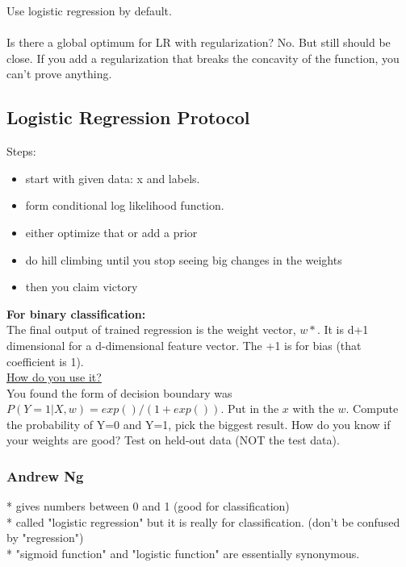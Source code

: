 Use logistic regression by default.  \hfill \\  \hfill \\

Is there a global optimum for LR with regularization?
No.  But still should be close. 
If you add a regularization that breaks the concavity of the function, you can't prove anything.
\hfill \\

\subsection{Logistic Regression Protocol}
Steps:
\begin{itemize}
	\item start with given data: x and labels.
	\item form conditional log likelihood function.
	\item either optimize that or add a prior
	\item do hill climbing until you stop seeing big changes in the weights
	\item then you claim victory
\end{itemize}

\textbf{For binary classification:} \hfill \\
The final output of trained regression is the weight vector, $w*$.
It is d+1 dimensional for a d-dimensional feature vector.  The +1 is for bias (that coefficient is 1).  \hfill \\

\underline{How do you use it?}  \hfill \\
You found the form of decision boundary was $P(Y=1|X,w) = exp()/(1+ exp())$.
Put in the $x$ with the $w$.  
Compute the probability of Y=0 and Y=1, pick the biggest result. 
How do you know if your weights are good? 
Test on held-out data (NOT the test data). 

\subsubsection{Andrew Ng}
* gives numbers between 0 and 1 (good for classification)   \hfill \\
* called "logistic regression" but it is really for classification.  (don't be confused by "regression") \hfill \\
* "sigmoid function" and "logistic function" are essentially synonymous.  \hfill \\
 
